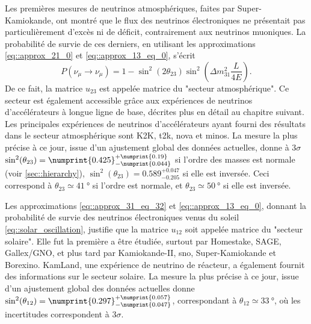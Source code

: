       Les premières mesures de neutrinos atmosphériques, faites par Super-Kamiokande\cite{Fukuda1998}, ont montré que le flux des neutrinos électroniques ne présentait pas particulièrement d'excès ni de déficit, contrairement aux neutrinos muoniques. La probabilité de survie de ces derniers, en utilisant les approximations \eqref{eq::approx_21_0} et \eqref{eq::approx_13_eq_0}, s'écrit
      \begin{equation}\label{eq::mu_approx_atmo}
        P(\nu_{\mu}\to\nu_{\mu}) = 1 - \sin^2(2\theta_{23})\sin^2\left(\Delta m^2_{31}\frac{L}{4E}\right).
      \end{equation}
      De ce fait, la matrice $u_{23}$ est appelée matrice du "secteur atmosphérique". Ce secteur est également accessible grâce aux expériences de neutrinos d'accélérateurs à longue ligne de base, décrites plus en détail au chapitre suivant. Les principales expériences de neutrinos d'accélérateurs ayant fourni des résultats dans le secteur atmosphérique sont K2K\cite{Collaboration2006a}, \gls{t2k}\cite{Abe2018}, \gls{nova}\cite{Adamson2016} et \gls{minos}\cite{Collaboration2014}. La mesure la plus précise à ce jour, issue d'un ajustement global des données actuelles, donne à $3\sigma$ $\sin^2(\theta_{23})=\numprint{0.425}^{+\numprint{0.19}}_{-\numprint{0.044}}$\cite{pdg2018} si l'ordre des masses est normale (voir \autoref{sec::hierarchy}), $\sin^2(\theta_{23})=0.589^{+0.047}_{-0.205}$ si elle est inversée. Ceci correspond à $\theta_{23}\simeq\SI{41}{\degree}$ si l'ordre est normale, et $\theta_{23}\simeq\SI{50}{\degree}$ si elle est inversée.

      Les approximations \eqref{eq::approx_31_eq_32} et \eqref{eq::approx_13_eq_0}, donnant la probabilité de survie des neutrinos électroniques venus du soleil \eqref{eq::solar_oscillation}, justifie que la matrice $u_{12}$ soit appelée matrice du "secteur solaire". Elle fut la première a être étudiée, surtout par Homestake\cite{Lande1990}, SAGE\cite{Collaboration2009}, Gallex/GNO\cite{Hampel1999}, et plus tard par  Kamiokande-II\cite{Hirata1992}, \gls{sno}\cite{Aharmim2013}, Super-Kamiokande\cite{Abe2018} et Borexino\cite{Collaboration2013}. KamLand\cite{Collaboration2004}, une expérience de neutrino de réacteur, a également fournit des informations sur le secteur solaire. La mesure la plus précise à ce jour, issue d'un ajustement global des données actuelles donne $\sin^2(\theta_{12})=\numprint{0.297}^{+\numprint{0.057}}_{-\numprint{0.047}}$\cite{pdg2018}, correspondant à $\theta_{12}\simeq\SI{33}{\degree}$, où les incertitudes correspondent à $3\sigma$.

